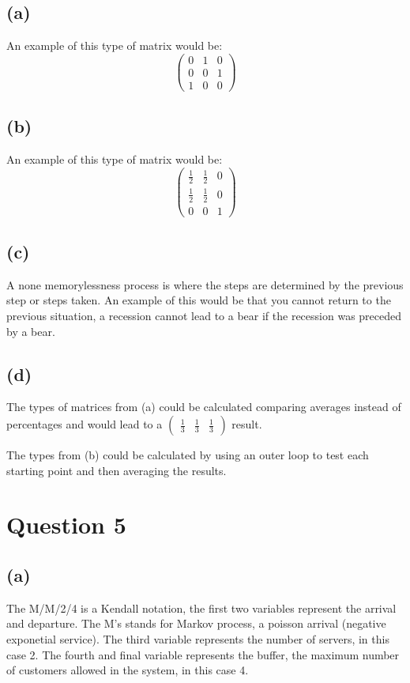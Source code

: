 \documentclass{article}
\begin{document}
\subsection{(a)}
An example of this type of matrix would be: 
\[
    \begin{pmatrix}
        0 & 1 & 0 \\
        0 & 0 & 1 \\
        1 & 0 & 0
    \end{pmatrix}
\]
    
\subsection{(b)}
An example of this type of matrix would be: 
\[
    \begin{pmatrix}
        \frac{1}{2} & \frac{1}{2} & 0 \\
        \frac{1}{2} & \frac{1}{2} & 0 \\
        0 & 0 & 1
    \end{pmatrix}
\]

\subsection{(c)}
A none memorylessness process is where the steps are determined by the previous step or steps taken. An example of this would be that you cannot return to the previous situation, a recession cannot lead to a bear if the recession was preceded by a bear.

\subsection{(d)}
The types of matrices from (a) could be calculated comparing averages instead of percentages and would lead to a \( \begin{pmatrix}
    \frac{1}{3} & \frac{1}{3} & \frac{1}{3}
\end{pmatrix} \) result.

The types from (b) could be calculated by using an outer loop to test each starting point and then averaging the results.





\section{Question 5}
\subsection{(a)}
The M/M/2/4 is a Kendall notation, the first two variables represent the arrival and departure. The M's stands for Markov process, a poisson arrival (negative exponetial service). The third variable represents the number of servers, in this case 2. The fourth and final variable represents the buffer, the maximum number of customers allowed in the system, in this case 4.
\end{document}
